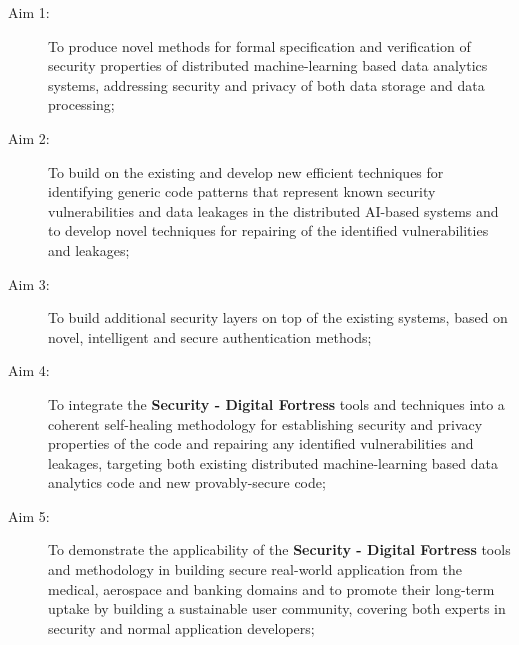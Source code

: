 \documentclass[a4paper,11pt]{article}
\newcommand{\project}[1]{\textbf{#1}\xspace}
\newcommand{\SECURITY}{\project{Security - Digital Fortress}}
\newcommand{\TheProject}{\SECURITY}
\begin{document}
\begin{description}
\item[Aim 1:] To produce novel methods for formal specification and verification of security properties of
  distributed machine-learning based data analytics systems, addressing security and privacy of both data storage and data processing;

\item[Aim 2:] To build on the existing and develop new efficient techniques for identifying generic code patterns that
  represent known security vulnerabilities and data leakages in the distributed AI-based systems and to develop novel techniques for  
  repairing of the identified vulnerabilities and leakages;

\item[Aim 3:] To build additional security layers on top of the existing systems, based on novel, intelligent and secure authentication methods;

\item[Aim 4:] To integrate the \TheProject{} tools and techniques into a coherent self-healing methodology for establishing
  security and privacy properties of the code and repairing any identified vulnerabilities and leakages, targeting both 
  existing distributed machine-learning based data analytics code and new provably-secure code;

\item[Aim 5:]  To demonstrate the applicability of the \TheProject{} tools and
 methodology in building secure real-world application from the medical, aerospace and
 banking domains and to promote their long-term uptake by building a sustainable user community,
 covering both experts in security and normal application developers;

\end{description}
\end{document}
